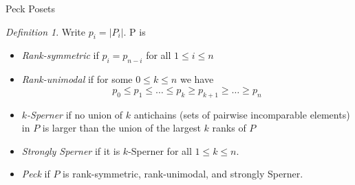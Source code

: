 \documentclass{beamer}
\newtheorem{lem}[thm]{Lemma}
\theoremstyle{remark}
\newtheorem{defn}[thm]{Definition}
\begin{document}
\begin{frame}{Peck Posets}
\begin{defn}
Write $p_i = |P_i|$.  P is
\begin{itemize}

\item \textit{Rank-symmetric} if $p_i = p_{n-i}$ for all $1\le i\le n$

\item \textit{Rank-unimodal} if for some $0\le k\le n$ we have
$$p_0\le p_1\le \ldots \le p_k \ge p_{k+1} \ge\ldots \ge p_n$$

\item \textit{$k$-Sperner} if no union of $k$ antichains (sets of pairwise incomparable elements) in $P$ is larger than the union of the largest $k$ ranks of $P$

\item \textit{Strongly Sperner} if it is $k$-Sperner for all $1\le k\le n$.

\item \textit{Peck} if $P$ is rank-symmetric, rank-unimodal, and strongly Sperner.
\end{itemize}
\end{defn}
\end{frame}










\end{document}
